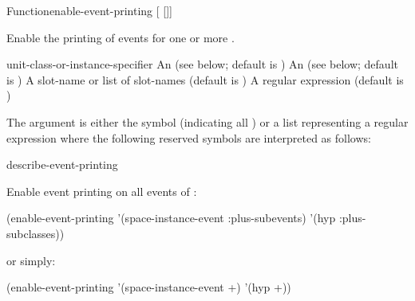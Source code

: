 \documentclass[10pt,twoside,english,pdftex]{article}
\begin{document}

\begin{functiondoc}{Function}{enable-event-printing}%
{[ 
[]] \\
 }
%


\fnsyntax

\fnpurpose Enable the printing of events for one or more .

\fnpackage {}

\fnmodule {}

\fnargs
\begin{args}{unit-class-or-instance-specifier}
 An  
(see below; default is )
 An 
(see below; default is )
 A slot-name or list of slot-names
(default is )
 A  regular expression
(default is \code{(*)})
\end{args}

\fndsyntax
\W\supp\tabletop
\eventclassspec
\subeventingspec
\syntaxsep
\unitclassinstancespec
\subclassingspec

\fndescription 
The  argument is either the symbol  (indicating
all ) or a list representing a regular
expression where the following reserved symbols are interpreted as
follows:
\spaceinstanceregexp

\begin{alsos}{describe-event-printing}
\end{alsos}

\fnexample
Enable event printing on all  events of
 :
%
\W\supp
\begin{example}
  (enable-event-printing '(space-instance-event :plus-subevents)
                         '(hyp :plus-subclasses))
\end{example}
%
or simply:
%
\W\supp\notpretop
\begin{example}
  (enable-event-printing '(space-instance-event +) '(hyp +))
\end{example}

\fnnote
\instanceevfnsnyi

\end{functiondoc}
\end{document}
